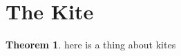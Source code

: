 \documentclass{tufte-handout}
\theoremstyle{definition}
\newtheorem{theorem}{Theorem}[section]
\begin{document}
\setcounter{section}{2}
\setcounter{theorem}{0}
\section{The Kite}\label{section:kites}


\begin{theorem}\label{theorem:kites-1}
here is a thing about kites
\end{theorem}
\end{document}
